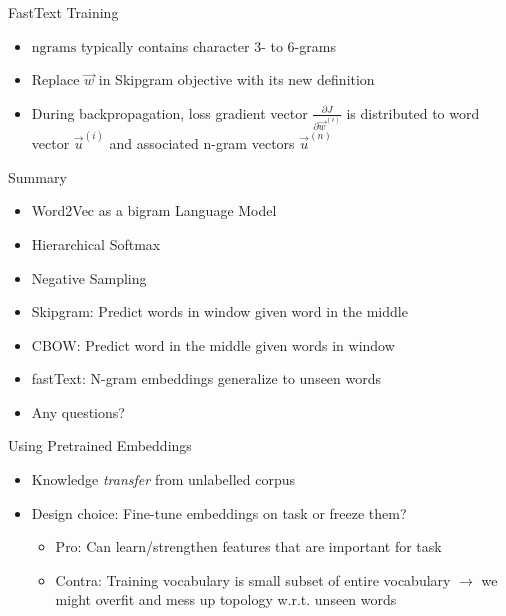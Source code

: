 
\begin{vbframe}{FastText Training}

\vfill

\begin{itemize}
\item $\mathrm{ngrams}$ typically contains character 3- to 6-grams
\item Replace $\vec w$ in Skipgram objective with its new definition
\item During backpropagation, loss gradient vector $\frac{\partial J}{\partial \vec w^{(i)}}$ is distributed to word vector $\vec u^{(i)}$ and associated n-gram vectors $\vec u^{(n)}$
\end{itemize}

\vfill

\end{vbframe}


\begin{vbframe}{Summary}

\vfill

\begin{itemize}
	\item Word2Vec as a bigram Language Model
	\item Hierarchical Softmax
	\item Negative Sampling
	\item Skipgram: Predict words in window given word in the middle
	\item CBOW: Predict word in the middle given words in window
	\item fastText: N-gram embeddings generalize to unseen words
	\item Any questions?
\end{itemize}

\vfill

\end{vbframe}


\begin{vbframe}{Using Pretrained Embeddings}

\vfill

\begin{itemize}
	\item Knowledge \emph{transfer} from unlabelled corpus
	\item Design choice: Fine-tune embeddings on task or freeze them?
		\begin{itemize}
			\item Pro: Can learn/strengthen features that are important for task
			\item Contra: Training vocabulary is small subset of entire vocabulary $\rightarrow$ we might overfit and mess up topology w.r.t. unseen words
		\end{itemize}
\end{itemize}

\vfill

\end{vbframe}

